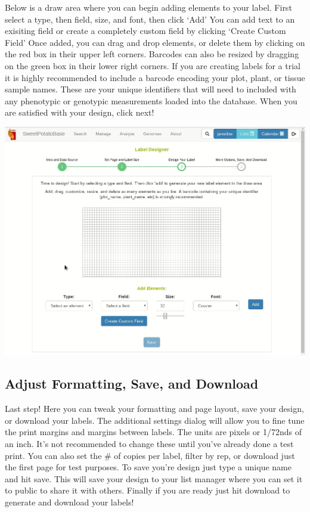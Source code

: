 \documentclass[
  12pt,
]{book}
\begin{document}
Below is a draw area where you can begin adding elements to your label. First select a type, then field, size, and font, then click `Add' You can add text to an exisiting field or create a completely custom field by clicking `Create Custom Field' Once added, you can drag and drop elements, or delete them by clicking on the red box in their upper left corners. Barcodes can also be resized by dragging on the green box in their lower right corners. If you are creating labels for a trial it is highly recommended to include a barcode encoding your plot, plant, or tissue sample names. These are your unique identifiers that will need to included with any phenotypic or genotypic measurements loaded into the database. When you are satisfied with your design, click next!

\begin{center}\includegraphics[width=0.95\linewidth]{assets/gifs/gif3} \end{center}

\hypertarget{adjust-formatting-save-and-download}{%
\subsection{Adjust Formatting, Save, and Download}\label{adjust-formatting-save-and-download}}

Last step! Here you can tweak your formatting and page layout, save your design, or download your labels. The additional settings dialog will allow you to fine tune the print margins and margins between labels. The units are pixels or 1/72nds of an inch. It's not recommended to change these until you've already done a test print. You can also set the \# of copies per label, filter by rep, or download just the first page for test purposes. To save you're design just type a unique name and hit save. This will save your design to your list manager where you can set it to public to share it with others. Finally if you are ready just hit download to generate and download your labels!
\end{document}
